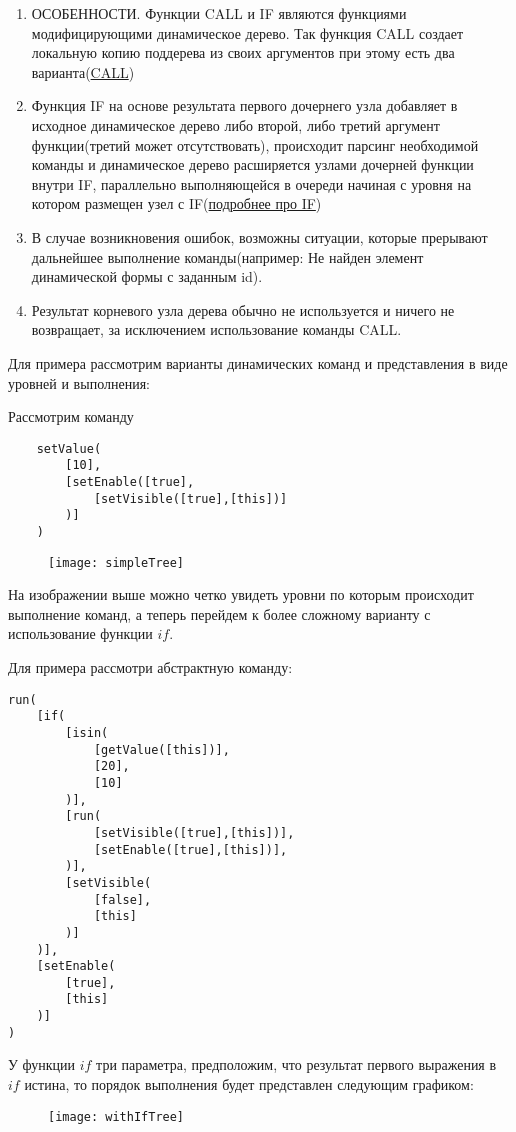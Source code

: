 \documentclass[../index.tex]{subfiles}
\begin{document}
\begin{enumerate}
    \item ОСОБЕННОСТИ. Функции CALL и IF являются функциями модифицирующими динамическое дерево. Так функция CALL создает локальную копию поддерева из своих аргументов при этому есть два варианта(\hyperref[sec:fcall]{CALL})
    \item Функция IF на основе результата первого дочернего узла добавляет в исходное динамическое дерево либо второй, либо третий аргумент функции(третий может отсутствовать), происходит парсинг необходимой команды и динамическое дерево расширяется узлами дочерней функции внутри IF, параллельно выполняющейся в очереди начиная с уровня на котором размещен узел с IF(\hyperref[sec:fif]{подробнее про IF})
    \item В случае возникновения ошибок, возможны ситуации, которые прерывают дальнейшее выполнение команды(например: Не найден элемент динамической формы с заданным id).
    \item Результат корневого узла дерева обычно не используется и ничего не возвращает, за исключением  использование команды CALL.
\end{enumerate}
Для примера рассмотрим варианты динамических команд и представления в виде уровней и выполнения:

Рассмотрим команду 
\begin{verbatim}
    setValue(
        [10],
        [setEnable([true],
            [setVisible([true],[this])]
        )]
    )
\end{verbatim}

\begin{figure}[h]
	\texttt{[image: simpleTree]}
	\centering
\end{figure}
На изображении выше можно четко увидеть уровни по которым происходит выполнение команд, а теперь перейдем к более сложному варианту с использование функции $if$.

Для примера рассмотри абстрактную команду:
\begin{verbatim}
run(
    [if(
        [isin(
            [getValue([this])],
            [20],
            [10]
        )],
        [run(
            [setVisible([true],[this])],
            [setEnable([true],[this])],
        )],
        [setVisible(
            [false],
            [this]
        )]
    )],
    [setEnable(
        [true],
        [this]
    )]
)
\end{verbatim}
У функции $if$ три параметра, предположим, что результат первого выражения в $if$ истина, то порядок выполнения будет представлен следующим графиком:
\begin{figure}[h]
	\texttt{[image: withIfTree]}
	\centering
\end{figure}
\end{document}

